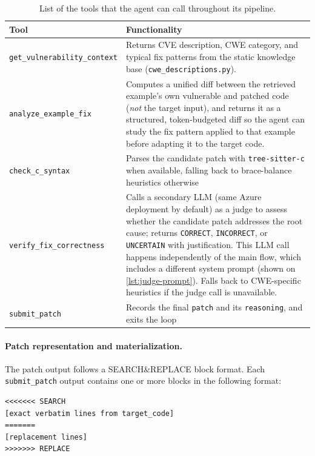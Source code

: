 \begin{table}[ht]
\caption[Available Tools Table]{List of the tools that the agent can call throughout its pipeline.}\label{tab:api_call}

\centering
\begin{tabularx}{\textwidth}{l X}
  \toprule
  \textbf{Tool} & \textbf{Functionality} \\
  \midrule
  \texttt{get\_vulnerability\_context} & Returns CVE description, CWE category, and typical fix patterns from the static knowledge base (\texttt{cwe\_descriptions.py}).%
  \\
  \addlinespace
  \texttt{analyze\_example\_fix} & Computes a unified diff between the retrieved example's own vulnerable and patched code (\emph{not} the target input), and returns it as a structured, token-budgeted diff so the agent can study the fix pattern applied to that example before adapting it to the target code.\\
  \addlinespace
  \texttt{check\_c\_syntax} & Parses the candidate patch with \texttt{tree-sitter-c} when available, falling back to brace-balance heuristics otherwise\\
  \addlinespace
  \texttt{verify\_fix\_correctness} & Calls a secondary LLM (same Azure deployment by default) as a judge to assess whether the candidate patch addresses the root cause; returns \texttt{CORRECT}, \texttt{INCORRECT}, or \texttt{UNCERTAIN} with justification. This LLM call happens independently of the main flow, which includes a different system prompt (shown on \ref{lst:judge-prompt}).
   Falls back to CWE-specific heuristics if the judge call is unavailable. \\
  \texttt{submit\_patch} & Records the final \texttt{patch} and its \texttt{reasoning}, and exits the loop \\
\end{tabularx} 
\end{table}


\paragraph{Patch representation and materialization.} The patch output follows a SEARCH\&REPLACE block format. 
Each \texttt{submit\_patch} output contains one or more blocks in the following format:

\begin{verbatim}
<<<<<<< SEARCH
[exact verbatim lines from target_code]
=======
[replacement lines]
>>>>>>> REPLACE
\end{verbatim}

